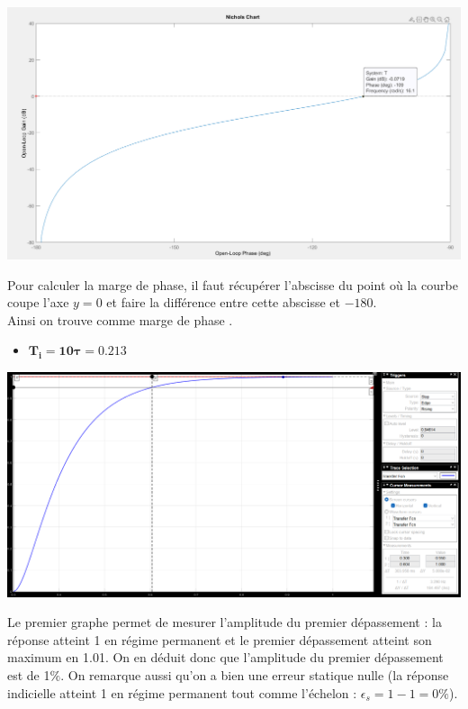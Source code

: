 \documentclass[12pt]{article}
\begin{document}
\begin{center}
    \includegraphics[width = 19 cm]{TP2 Simulink/Syst_1/Ti=5tau_syst_1_Black.png}
\end{center}
Pour calculer la marge de phase, il faut récupérer l'abscisse du point où la courbe coupe l'axe $y=0$ et faire la différence entre cette abscisse et $-180$.
\\Ainsi on trouve comme marge de phase .
\newpage
\begin{itemize}
    \item \large $\mathbf{T_i = 10\tau = 0.213}$
\end{itemize}
\begin{center}
    
    \includegraphics[width = 19 cm]{TP2 Simulink/Syst_1/tr5prct_syst1_Ti=10tau.png}
    
\end{center}
\normalsize Le premier graphe permet de mesurer l'amplitude du premier dépassement : la réponse atteint 1 en régime permanent et le premier dépassement atteint son maximum en 1.01. On en déduit donc que l'amplitude du premier dépassement est de 1$\%$.
On remarque aussi qu'on a bien une erreur statique nulle (la réponse indicielle atteint 1 en régime permanent tout comme l'échelon : $\epsilon_s = 1-1 = 0\%$).
\end{document}
